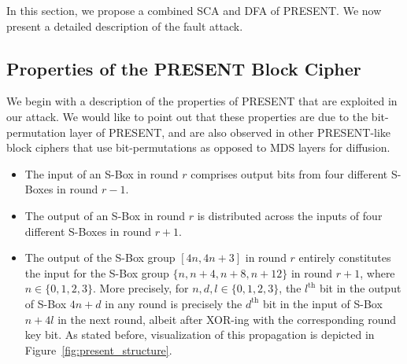 \documentclass[10pt, conference, compsocconf]{IEEEtran}  %
\numberwithin{Definition}{section}
\numberwithin{Claim}{section}
\begin{document}
In this section, we propose a combined SCA and DFA of PRESENT. We now present a detailed description of the fault attack.

\subsection{Properties of the PRESENT Block Cipher}
\label{subsec:properties}

We begin with a description of the properties of PRESENT that are exploited in our attack. We would like to point out that these properties are due to the bit-permutation layer of PRESENT, and are also observed in other PRESENT-like block ciphers that use bit-permutations as opposed to MDS layers for diffusion.

\begin{itemize}
\item The input of an S-Box in round $r$ comprises output bits from four different S-Boxes in round $r-1$.
\item The output of an S-Box in round $r$ is distributed across the inputs of four different S-Boxes in round $r+1$.
\item The output of the S-Box group $[4n,4n+3]$ in round $r$ entirely constitutes the input for the S-Box group $\{n, n+4,n+8, n+12\}$ in round $r+1$, where $n\in\{0,1,2,3\}$. More precisely, for $n,d,l\in\{0,1,2,3\}$, the $l^{\text{th}}$ bit in the output of S-Box $4n+d$ in any round is precisely the $d^{\text{th}}$ bit in the input of S-Box $n+4l$ in the next round, albeit after XOR-ing with the corresponding round key bit. As stated before, visualization of this propagation is depicted in Figure~\ref{fig:present_structure}.
\end{itemize}
\end{document}
